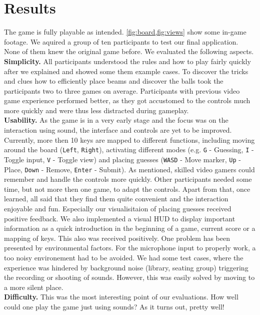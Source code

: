 \documentclass[conference]{IEEEtran}
\begin{document}
\section{Results}
The game is fully playable as intended. 
\cref{fig:board,fig:views} show some in-game footage.
We aquired a group of ten participants to test our final application.
None of them knew the original game before.
We evaluated the following aspects. \\
\textbf{Simplicity.}
All participants understood the rules and how to play fairly quickly after we explained and showed some them example cases.
To discover the tricks and clues how to efficiently place beams and discover the balls took the participants two to three games on average.
Participants with previous video game experience performed better, as they got accustomed to the controls much more quickly and were thus less distracted during gameplay. \\
\textbf{Usability.}
As the game is in a very early stage and the focus was on the interaction using sound, the interface and controls are yet to be improved.
Currently, more then 10 keys are mapped to different functions, including moving around the board (\texttt{Left}, \texttt{Right}), activating different modes (e.g. \texttt{G} - Guessing, \texttt{I} - Toggle input, \texttt{V} - Toggle view) and placing guesses (\texttt{WASD} - Move marker, \texttt{Up} - Place, \texttt{Down} - Remove, \texttt{Enter} - Submit).
As mentioned, skilled video gamers could remember and handle the controls more quickly.
Other participants needed some time, but not more then one game, to adapt the controls.
Apart from that, once learned, all said that they find them quite convenient and the interaction enjoyable and fun. 
Especially our visualisitaion of placing guesses received positive feedback.
We also implemented a visual HUD to display important information as a quick introduction in the beginning of a game, current score or a mapping of keys.
This also was received positively. 
One problem has been presented by environmental factors.
For the microphone input to properly work, a too noisy environement had to be avoided.
We had some test cases, where the experience was hindered by background noise (library, seating group) triggering the recording or shooting of sounds. 
However, this was easily solved by moving to a more silent place. \\ 
\textbf{Difficulty.}
This was the most interesting point of our evaluations.
How well could one play the game just using sounds?
As it turns out, pretty well!
\end{document}

